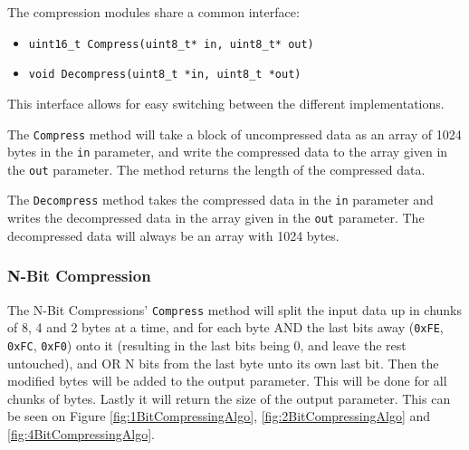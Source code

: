 The compression modules share a common interface: 

\begin{itemize}
    \item \texttt{uint16\_t Compress(uint8\_t* in, uint8\_t* out)}
    \item \texttt{void Decompress(uint8\_t *in, uint8\_t *out)}
\end{itemize}

This interface allows for easy switching between the different implementations.

The \texttt{Compress} method will take a block of uncompressed data as an array of 1024 bytes in the \texttt{in} parameter, and write the compressed data to the array given in the \texttt{out} parameter. The method returns the length of the compressed data.

The \texttt{Decompress} method takes the compressed data in the \texttt{in} parameter and writes the decompressed data in the array given in the \texttt{out} parameter.
The decompressed data will always be an array with 1024 bytes.



\subsubsection{N-Bit Compression}

The N-Bit Compressions' \texttt{Compress} method will split the input data up in chunks of 8, 4 and 2 bytes at a time, and for each byte AND the last bits away (\texttt{0xFE}, \texttt{0xFC}, \texttt{0xF0}) onto it (resulting in the last bits being 0, and leave the rest untouched), and OR N bits from the last byte unto its own last bit.
Then the modified bytes will be added to the output parameter.
This will be done for all chunks of bytes.
Lastly it will return the size of the output parameter.
This can be seen on Figure \ref{fig:1BitCompressingAlgo}, \ref{fig:2BitCompressingAlgo} and \ref{fig:4BitCompressingAlgo}.

